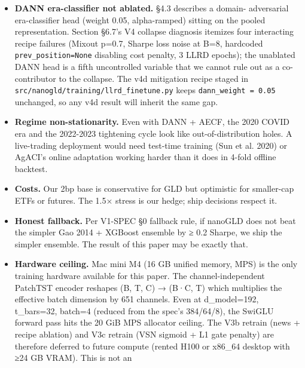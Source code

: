 \documentclass[
]{article}
\begin{document}
\begin{itemize}
  weekly--quarterly become near-constants. the macro-feature-collapse
  Lean-200 prediction is that pruning to ≤200 fast-cadence channels
  lifts fold-0 Sharpe by ≥+0.4. The accompanying VSN fix (V3b commit
  \texttt{6d58493}, \texttt{NANOGLD\_VSN\_GATE=sigmoid}) is necessary
  but not sufficient; the unified.pt itself needs a Lean rebuild
  (\textasciitilde30h compute) before the full hypothesis can be tested.
\item
  \textbf{DANN era-classifier not ablated.} §4.3 describes a domain-
  adversarial era-classifier head (weight 0.05, alpha-ramped) sitting on
  the pooled representation. Section §6.7's V4 collapse diagnosis
  itemizes four interacting recipe failures (Mixout p=0.7, Sharpe loss
  noise at B=8, hardcoded \texttt{prev\_position=None} disabling cost
  penalty, 3 LLRD epochs); the unablated DANN head is a fifth
  uncontrolled variable that we cannot rule out as a co-contributor to
  the collapse. The v4d mitigation recipe staged in
  \texttt{src/nanogld/training/llrd\_finetune.py} keeps
  \texttt{dann\_weight\ =\ 0.05} unchanged, so any v4d result will
  inherit the same gap.
\item
  \textbf{Regime non-stationarity.} Even with DANN + AECF, the 2020
  COVID era and the 2022-2023 tightening cycle look like
  out-of-distribution holes. A live-trading deployment would need
  test-time training (Sun et al. 2020) or AgACI's online adaptation
  working harder than it does in 4-fold offline backtest.
\item
  \textbf{Costs.} Our 2bp base is conservative for GLD but optimistic
  for smaller-cap ETFs or futures. The 1.5× stress is our hedge; ship
  decisions respect it.
\item
  \textbf{Honest fallback.} Per V1-SPEC §0 fallback rule, if nanoGLD
  does not beat the simpler Gao 2014 + XGBoost ensemble by ≥ 0.2 Sharpe,
  we ship the simpler ensemble. The result of this paper may be exactly
  that.
\item
  \textbf{Hardware ceiling.} Mac mini M4 (16 GB unified memory, MPS) is
  the only training hardware available for this paper. The
  channel-independent PatchTST encoder reshapes (B, T, C) → (B·C, T)
  which multiplies the effective batch dimension by 651 channels. Even
  at d\_model=192, t\_bars=32, batch=4 (reduced from the spec's
  384/64/8), the SwiGLU forward pass hits the 20 GiB MPS allocator
  ceiling. The V3b retrain (news + recipe ablation) and V3c retrain (VSN
  sigmoid + L1 gate penalty) are therefore deferred to future compute
  (rented H100 or x86\_64 desktop with ≥24 GB VRAM). This is not an

\end{itemize}
\end{document}

